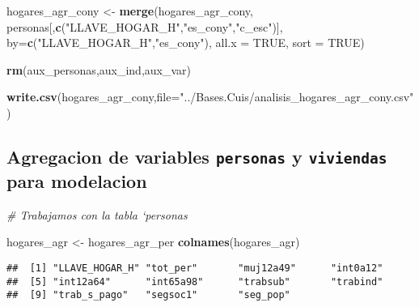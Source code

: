 \documentclass[11pt,]{article}
\newenvironment{Shaded}{\begin{snugshade}}{\end{snugshade}}
\newcommand{\KeywordTok}[1]{\textcolor[rgb]{0.13,0.29,0.53}{\textbf{#1}}}
\newcommand{\DataTypeTok}[1]{\textcolor[rgb]{0.13,0.29,0.53}{#1}}
\newcommand{\StringTok}[1]{\textcolor[rgb]{0.31,0.60,0.02}{#1}}
\newcommand{\CommentTok}[1]{\textcolor[rgb]{0.56,0.35,0.01}{\textit{#1}}}
\newcommand{\OtherTok}[1]{\textcolor[rgb]{0.56,0.35,0.01}{#1}}
\newcommand{\NormalTok}[1]{#1}
\begin{document}
\begin{Shaded}
\begin{Highlighting}[]
\NormalTok{hogares_agr_cony <-}\StringTok{ }\KeywordTok{merge}\NormalTok{(hogares_agr_cony,}
\NormalTok{                          personas[,}\KeywordTok{c}\NormalTok{(}\StringTok{"LLAVE_HOGAR_H"}\NormalTok{,}\StringTok{"es_cony"}\NormalTok{,}\StringTok{"c_esc"}\NormalTok{)],}
                          \DataTypeTok{by=}\KeywordTok{c}\NormalTok{(}\StringTok{"LLAVE_HOGAR_H"}\NormalTok{,}\StringTok{"es_cony"}\NormalTok{),}
                          \DataTypeTok{all.x =} \OtherTok{TRUE}\NormalTok{,}
                          \DataTypeTok{sort =} \OtherTok{TRUE}\NormalTok{)}

\KeywordTok{rm}\NormalTok{(aux_personas,aux_ind,aux_var)}

\KeywordTok{write.csv}\NormalTok{(hogares_agr_cony,}\DataTypeTok{file=}\StringTok{"../Bases.Cuis/analisis_hogares_agr_cony.csv"}\NormalTok{)}
\end{Highlighting}
\end{Shaded}

\subsection{\texorpdfstring{Agregacion de variables \texttt{personas} y
\texttt{viviendas} para
modelacion}{Agregacion de variables personas y viviendas para modelacion}}\label{agregacion-de-variables-personas-y-viviendas-para-modelacion}

\begin{Shaded}
\begin{Highlighting}[]
\CommentTok{# Trabajamos con la tabla `personas}

\NormalTok{hogares_agr <-}\StringTok{ }\NormalTok{hogares_agr_per}
\KeywordTok{colnames}\NormalTok{(hogares_agr)}
\end{Highlighting}
\end{Shaded}

\begin{verbatim}
##  [1] "LLAVE_HOGAR_H" "tot_per"       "muj12a49"      "int0a12"      
##  [5] "int12a64"      "int65a98"      "trabsub"       "trabind"      
##  [9] "trab_s_pago"   "segsoc1"       "seg_pop"
\end{verbatim}
\end{document}
